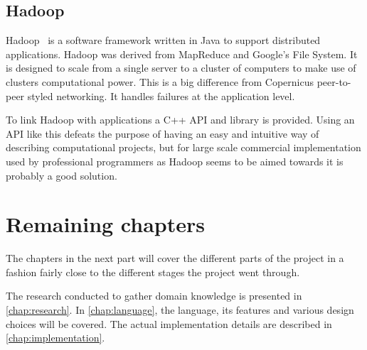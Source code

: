 \subsection{Hadoop}
Hadoop~\cite{hadoop:online} is a software framework written in Java to
support distributed applications. Hadoop was derived from MapReduce
and Google's File System. It is designed to scale from a single server
to a cluster of computers to make use of clusters computational
power. This is a big difference from Copernicus peer-to-peer styled
networking. It handles failures at the application level.

To link Hadoop with applications a C++ API and library is
provided. Using an API like this defeats the purpose of having an easy
and intuitive way of describing computational projects, but for large
scale commercial implementation used by professional programmers as
Hadoop seems to be aimed towards it is probably a good solution.


\section{Remaining chapters}
The chapters in the next part will cover the different parts of the
project in a fashion fairly close to the different stages the project
went through.

The research conducted to gather domain knowledge is presented in
\autoref{chap:research}. In \autoref{chap:language}, the language, its
features and various design choices will be covered. The actual
implementation details are described in \autoref{chap:implementation}.
